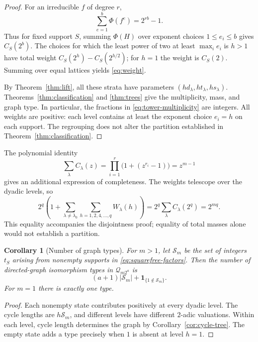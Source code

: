 \documentclass[11pt]{article}
\newtheorem{corollary}[theorem]{Corollary}
\theoremstyle{definition}
\theoremstyle{remark}
\numberwithin{equation}{section}
\newcommand{\Q}{\mathcal Q}
\newcommand{\phip}{\Phi}
\begin{document}
\begin{proof}
For an irreducible $f$ of degree $r$,
\begin{equation}\label{eq:local-sum}
 \sum_{e=1}^{b}\phip(f^e)=2^{rb}-1.
\end{equation}
Thus for fixed support $S$, summing $\phip(H)$ over exponent choices
$1\le e_i\le b$ gives $C_S(2^b)$. The choices for which the least power
of two at least $\max_i e_i$ is $h>1$ have total weight
$C_S(2^h)-C_S(2^{h/2})$; for $h=1$ the weight is $C_S(2)$.
Summing over equal lattices yields \eqref{eq:weight}.

By Theorem~\ref{thm:lift}, all these strata have parameters
$(hd_\lambda,ht_\lambda,hs_\lambda)$. Theorems~\ref{thm:classification}
and \ref{thm:trees} give the multiplicity, mass, and graph type. In
particular, the fractions in \eqref{eq:tower-multiplicity} are integers.
All weights are positive: each level contains at least the exponent choice
$e_i=h$ on each support. The regrouping does not alter the partition
established in Theorem~\ref{thm:classification}.
\end{proof}

The polynomial identity
\begin{equation}\label{eq:polynomial-coverage}
 \sum_\lambda C_\lambda(z)
 =\prod_{i=1}^r\bigl(1+(z^{r_i}-1)\bigr)=z^{m-1}
\end{equation}
gives an additional expression of completeness. The weights telescope over
the dyadic levels, so
\begin{equation}\label{eq:telescoping}
 2^q\left(1+
 \sum_{\lambda\ne\lambda_0}\sum_{h=1,2,4,\ldots,q}W_\lambda(h)\right)
 =2^q\sum_\lambda C_\lambda(2^q)=2^{mq}.
\end{equation}
This equality accompanies the disjointness proof; equality of total masses
alone would not establish a partition.

\begin{corollary}[Number of graph types]\label{cor:type-count}
For $m>1$, let $\mathcal S_m$ be the set of integers $t_S$ arising from
nonempty supports in \eqref{eq:squarefree-factors}. Then the number of
directed-graph isomorphism types in $\Q_{m2^a}$ is
\begin{equation}\label{eq:type-count}
 (a+1)|\mathcal S_m|+\mathbf 1_{\{1\notin\mathcal S_m\}}.
\end{equation}
For $m=1$ there is exactly one type.
\end{corollary}

\begin{proof}
Each nonempty state contributes positively at every dyadic level. The
cycle lengths are $h\mathcal S_m$, and different levels have different
$2$-adic valuations. Within each level, cycle length determines the graph
by Corollary~\ref{cor:cycle-tree}. The empty state adds a type precisely
when $1$ is absent at level $h=1$.
\end{proof}
\end{document}
